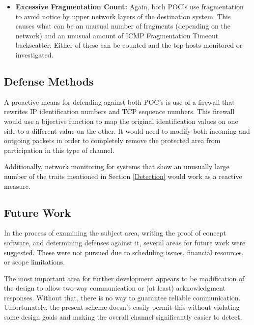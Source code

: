 \documentclass[letterpaper,10pt,draft]{article}
\begin{document}
\begin{itemize}
\item \textbf{Excessive Fragmentation Count:} Again, both POC's use
fragmentation to avoid notice by upper network layers of the
destination system.  This causes what can be an unusual number of
fragments (depending on the network) and an unusual amount of ICMP
Fragmentation Timeout backscatter.  Either of these can be counted and
the top hosts monitored or investigated.
\end{itemize}

\subsection{Defense Methods}

A proactive means for defending against both POC's is use of a
firewall that rewrites IP identification numbers and TCP sequence
numbers.  This firewall would use a bijective function to map the
original identification values on one side to a different value on the
other.  It would need to modify both incoming and outgoing packets in
order to completely remove the protected area from participation in
this type of channel.

Additionally, network monitoring for systems that show an unusually
large number of the traits mentioned in Section \ref{Detection} would
work as a reactive measure.

\subsection{Future Work}

In the process of examining the subject area, writing the proof of
concept software, and determining defenses against it, several areas
for future work were suggested.  These were not pursued due to
scheduling issues, financial resources, or scope limitations.

The most important area for further development appears to be
modification of the design to allow two-way communication or (at
least) acknowledgment responses.  Without that, there is no way to
guarantee reliable communication. Unfortunately, the present scheme
doesn't easily permit this without violating some design goals and
making the overall channel significantly easier to detect.
\end{document}
